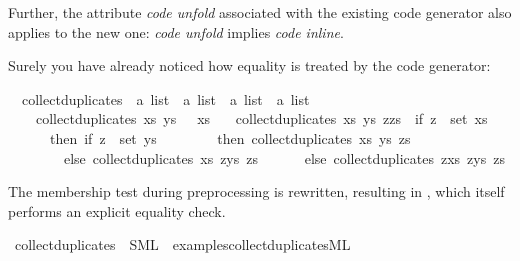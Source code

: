 \begin{isabellebody}
\begin{isamarkuptext}
\begin{warn}
    Further, the attribute \emph{code unfold}
    associated with the existing code generator also applies to
    the new one: \emph{code unfold} implies \emph{code inline}.
  \end{warn}%
\end{isamarkuptext}%
\isamarkuptrue%
%
\isamarkuptrue%
%
\begin{isamarkuptext}%
Surely you have already noticed how equality is treated
  by the code generator:%
\end{isamarkuptext}%
\isamarkuptrue%
\isamarkupfalse%
\isanewline
\ \ collect{\isacharunderscore}duplicates\ {\isacharcolon}{\isacharcolon}\ {\isachardoublequoteopen}{\isacharprime}a\ list\ {\isasymRightarrow}\ {\isacharprime}a\ list\ {\isasymRightarrow}\ {\isacharprime}a\ list\ {\isasymRightarrow}\ {\isacharprime}a\ list{\isachardoublequoteclose}\ \isanewline
\ \ \ \ {\isachardoublequoteopen}collect{\isacharunderscore}duplicates\ xs\ ys\ {\isacharbrackleft}{\isacharbrackright}\ {\isacharequal}\ xs{\isachardoublequoteclose}\isanewline
\ \ {\isacharbar}\ {\isachardoublequoteopen}collect{\isacharunderscore}duplicates\ xs\ ys\ {\isacharparenleft}z{\isacharhash}zs{\isacharparenright}\ {\isacharequal}\ {\isacharparenleft}if\ z\ {\isasymin}\ set\ xs\isanewline
\ \ \ \ \ \ then\ if\ z\ {\isasymin}\ set\ ys\isanewline
\ \ \ \ \ \ \ \ then\ collect{\isacharunderscore}duplicates\ xs\ ys\ zs\isanewline
\ \ \ \ \ \ \ \ else\ collect{\isacharunderscore}duplicates\ xs\ {\isacharparenleft}z{\isacharhash}ys{\isacharparenright}\ zs\isanewline
\ \ \ \ \ \ else\ collect{\isacharunderscore}duplicates\ {\isacharparenleft}z{\isacharhash}xs{\isacharparenright}\ {\isacharparenleft}z{\isacharhash}ys{\isacharparenright}\ zs{\isacharparenright}{\isachardoublequoteclose}%
\begin{isamarkuptext}%
The membership test during preprocessing is rewritten,
  resulting in , which itself
  performs an explicit equality check.%
\end{isamarkuptext}%
\isamarkuptrue%
\isamarkupfalse%
\ collect{\isacharunderscore}duplicates\ \ SML\ \ {\isachardoublequoteopen}examples{\isacharslash}collect{\isacharunderscore}duplicates{\isachardot}ML{\isachardoublequoteclose}%
\begin{isamarkuptext}%
%
\end{isamarkuptext}%
\isamarkuptrue%
%
\begin{isamarkuptext}%

\end{isamarkuptext}
\end{isabellebody}
